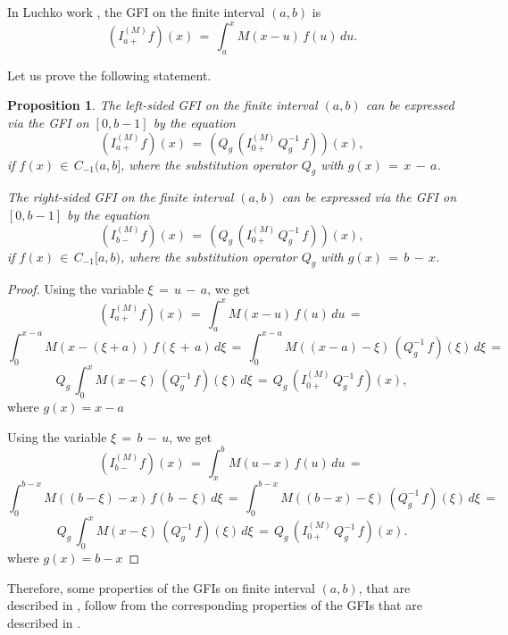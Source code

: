 \documentclass[12pt]{article}
\newtheorem{Proposition}{Proposition}
\begin{document}
In Luchko work \cite{Luchko2023}, 
the GFI on the finite interval $(a,b)$ is
\[
(I^{(M)}_{a+} f)(x) \, = \, 
\int^x_a M(x-u) \, f(u) \, du .
\]

Let us prove the following statement.

\begin{Proposition}

The left-sided GFI on the finite interval $(a,b)$ can be expressed via 
the GFI on $[0,b-1]$ by the equation
\begin{equation}
(I^{(M)}_{a+} f)(x) \, = \, 
(Q_{g} \, (I^{(M)}_{0+} \, Q^{-1}_g \, f))(x) ,
\end{equation}
if $f(x) \, \in \,C_{-1}(a,b]$, 
where the substitution operator 
$Q_g$ with $g(x) \, = \, x \, - \, a$.

The right-sided GFI on the finite interval $(a,b)$ can be expressed via 
the GFI on $[0,b-1]$ by the equation
\begin{equation}
(I^{(M)}_{b-} f)(x) \, = \, 
(Q_{g} \, (I^{(M)}_{0+} \, Q^{-1}_g \, f))(x) ,
\end{equation}
if $f(x) \, \in \,C_{-1}[a,b)$, 
where the substitution operator 
$Q_g$ with $g(x) \, = \, b \, - \, x$.

\end{Proposition}


\begin{proof}

Using the variable $\xi \, = \, u \, - \, a$, we get
\[
(I^{(M)}_{a+} f)(x) \, = \, 
\int^x_a M(x-u) \, f(u) \, du \, = \, 
\]
\[
\int^{x-a}_0 M(x-(\xi+a)) \, f(\xi \, + \, a) \, d \xi 
\, = \, 
\int^{x-a}_0 M((x-a)-\xi) \, (Q^{-1}_g \, f)(\xi) \, d \xi 
\, = \, 
\]
\[
Q_g \, 
\int^{x}_0 M(x-\xi) \, (Q^{-1}_g \, f)(\xi) \, d \xi 
\, = \, 
Q_{g} \, ( I^{(M)}_{0+} \, Q^{-1}_g \, f)(x) ,
\]
where $g(x)=x-a$

Using the variable $\xi \, = \, b \, - \, u$, we get
\[
(I^{(M)}_{b-} f)(x) \, = \, 
\int^b_x M(u-x) \, f(u) \, du \, = \, 
\]
\[
\int^{b-x}_0 M((b-\xi)-x) \, f(b \, - \, \xi) \, d \xi 
\, = \, 
\int^{b-x}_0 M((b-x)-\xi) \, (Q^{-1}_g \, f)(\xi) \, d \xi 
\, = \, 
\]
\[
Q_g \, 
\int^{x}_0 M(x-\xi) \, (Q^{-1}_g \, f)(\xi) \, d \xi 
\, = \, 
Q_{g} \, ( I^{(M)}_{0+} \, Q^{-1}_g \, f)(x) .
\]
where $g(x)=b-x$

\end{proof}


Therefore, some properties of the GFIs on finite interval $(a,b)$, that are described in \cite{Luchko2023}, follow from the corresponding properties of the GFIs that are described in \cite{Luchko2021-1}. 
\end{document}
